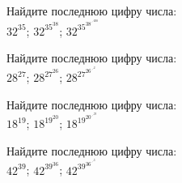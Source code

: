 
\begin{problems}

\item
Найдите последнюю цифру числа:
\\
\sbp $32^{35}$;
\quad
\sbp $32^{35^{38}}$;
\quad
\sbp $32^{35^{38^{\iddots^{200}}}}$

\item
Найдите последнюю цифру числа:
\\
\sbp $28^{27}$;
\quad
\sbp $28^{27^{26}}$;
\quad
\sbp $28^{27^{26^{\iddots^{2}}}}$

\item
Найдите последнюю цифру числа:
\\
\sbp $18^{19}$;
\quad
\sbp $18^{19^{20}}$;
\quad
\sbp $18^{19^{20^{\iddots^{99}}}}$

\item
Найдите последнюю цифру числа:
\\
\sbp $42^{39}$;
\quad
\sbp $42^{39^{36}}$;
\quad
\sbp $42^{39^{36^{\iddots^{3}}}}$

\end{problems}

